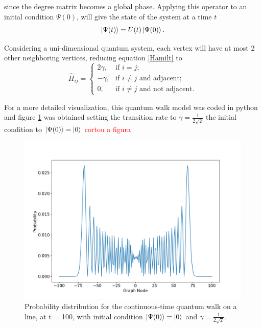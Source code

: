 \documentclass[../../dissertation.tex]{subfiles}
\begin{document}
since the degree matrix becomes a global phase.
Applying this operator to an initial condition $\Psi(0)$, will give the state of the system at a time $t$
\begin{equation}
	\ket{\Psi(t)} = U(t)\ket{\Psi(0)}.
\end{equation}\par
Considering a uni-dimensional quantum system, each vertex will have at most 2 other neighboring vertices, reducing equation \ref{Hamilt} to
\begin{equation}
	\hat{H}_{ij} = \begin{cases} 
		2\gamma, & \mbox{if } i= j; \\ 
		-\gamma, & \mbox{if } i\neq j\mbox{ and adjacent};\\
		0, & \mbox{if } i\neq j\mbox{ and not adjacent}.
	\end{cases}
\end{equation}\par
For a more detailed visualization, this quantum walk model was coded in python and figure \ref{fig:contdist0} was obtained setting the transition rate to $\gamma=\frac{1}{2\sqrt{2}}$ the initial condition to $\ket{\Psi(0)} = \ket{0}$ \textcolor{red}{cortou a figura}

\begin{figure}[!h]
	\centering
	\includegraphics[scale=0.40]{img/ContQuantumWalk/ctqwSinglePsi0.png}
	\caption{Probability distribution for the continuous-time quantum walk on a line, at t = 100, with initial condition $\ket{\Psi(0)}=\ket{0}$ and $\gamma=\frac{1}{2\sqrt{2}}$.} 
	\label{fig:contdist0}
\end{figure}
\end{document}
